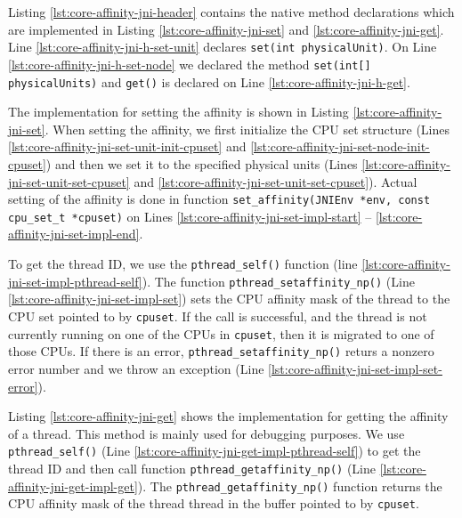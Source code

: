 

Listing \ref{lst:core-affinity-jni-header} contains the native method
declarations which are implemented in Listing
\ref{lst:core-affinity-jni-set} and
\ref{lst:core-affinity-jni-get}. Line
\ref{lst:core-affinity-jni-h-set-unit} declares
\lstinline!set(int physicalUnit)!. On Line
\ref{lst:core-affinity-jni-h-set-node} we declared the method
\lstinline!set(int[] physicalUnits)! and \lstinline!get()! is declared
on Line \ref{lst:core-affinity-jni-h-get}.





The implementation for setting the affinity is shown in Listing
\ref{lst:core-affinity-jni-set}. When setting the affinity, we first
initialize the CPU set structure (Lines
\ref{lst:core-affinity-jni-set-unit-init-cpuset} and
\ref{lst:core-affinity-jni-set-node-init-cpuset}) and then we set it
to the specified physical units (Lines
\ref{lst:core-affinity-jni-set-unit-set-cpuset} and
\ref{lst:core-affinity-jni-set-unit-set-cpuset}). Actual setting of
the affinity is done in function
\lstinline!set_affinity(JNIEnv *env, const cpu_set_t *cpuset)! on Lines
\ref{lst:core-affinity-jni-set-impl-start} --
\ref{lst:core-affinity-jni-set-impl-end}.

To get the thread ID, we use the \lstinline!pthread_self()! function
(line \ref{lst:core-affinity-jni-set-impl-pthread-self}). The function
\lstinline!pthread_setaffinity_np()! (Line
\ref{lst:core-affinity-jni-set-impl-set}) sets the CPU affinity mask
of the thread to the CPU set pointed to by \lstinline!cpuset!.  If the
call is successful, and the thread is not currently running on one of
the CPUs in \lstinline!cpuset!, then it is migrated to one of those
CPUs. If there is an error, \lstinline!pthread_setaffinity_np()!
returs a nonzero error number and we throw an exception (Line
\ref{lst:core-affinity-jni-set-impl-set-error}).

Listing \ref{lst:core-affinity-jni-get} shows the implementation for
getting the affinity of a thread. This method is mainly used for
debugging purposes. We use \lstinline!pthread_self()! (Line
\ref{lst:core-affinity-jni-get-impl-pthread-self}) to get the thread
ID and then call function \lstinline!pthread_getaffinity_np()!  (Line
\ref{lst:core-affinity-jni-get-impl-get}). The
\lstinline!pthread_getaffinity_np()! function returns the CPU affinity
mask of the thread thread in the buffer pointed to by
\lstinline!cpuset!.

